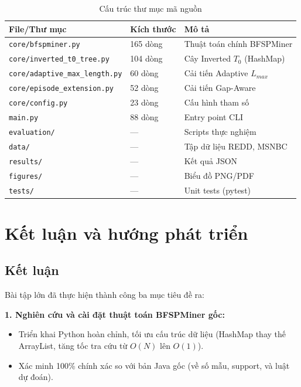 \documentclass[a4paper,12pt]{report}
\begin{document}
\begin{table}[H]
    \centering
    \caption{Cấu trúc thư mục mã nguồn}
    \label{tab:structure}
    \begin{tabular}{lll}
        \toprule
        \textbf{File/Thư mục} & \textbf{Kích thước} & \textbf{Mô tả} \\
        \midrule
        \texttt{core/bfspminer.py}          & 165 dòng & Thuật toán chính BFSPMiner \\
        \texttt{core/inverted\_t0\_tree.py} & 104 dòng & Cây Inverted $T_0$ (HashMap) \\
        \texttt{core/adaptive\_max\_length.py} & 60 dòng & Cải tiến Adaptive $L_{max}$ \\
        \texttt{core/episode\_extension.py} & 52 dòng  & Cải tiến Gap-Aware \\
        \texttt{core/config.py}             & 23 dòng  & Cấu hình tham số \\
        \texttt{main.py}                    & 88 dòng  & Entry point CLI \\
        \texttt{evaluation/}               & ---       & Scripts thực nghiệm \\
        \texttt{data/}                      & ---       & Tập dữ liệu REDD, MSNBC \\
        \texttt{results/}                   & ---       & Kết quả JSON \\
        \texttt{figures/}                   & ---       & Biểu đồ PNG/PDF \\
        \texttt{tests/}                     & ---       & Unit tests (pytest) \\
        \bottomrule
    \end{tabular}
\end{table}

\chapter{Kết luận và hướng phát triển}
\label{chap:conclusion}

\section{Kết luận}
Bài tập lớn đã thực hiện thành công ba mục tiêu đề ra:

\textbf{1. Nghiên cứu và cài đặt thuật toán BFSPMiner gốc:}
\begin{itemize}
    \item Triển khai Python hoàn chỉnh, tối ưu cấu trúc dữ liệu (HashMap thay thế ArrayList, tăng tốc tra cứu từ $O(N)$ lên $O(1)$).
    \item Xác minh 100\% chính xác so với bản Java gốc (về số mẫu, support, và luật dự đoán).
\end{itemize}
\end{document}
